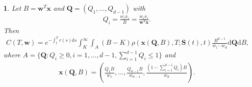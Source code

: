 \documentclass[english]{article}
\numberwithin{equation}{section}
\numberwithin{figure}{section}
\theoremstyle{bolddescit}
\theoremstyle{definition}
\theoremstyle{definition}
\theoremstyle{plain}
\newtheorem{lemma}[theorem]{\protect\lemmaname}
\theoremstyle{plain}
\theoremstyle{bolddesc}
\theoremstyle{plain}
\theoremstyle{remark}
\providecommand{\lemmaname}{Lemma}
\begin{document}
\begin{lemma}\label{lem:generalisation-var-change}
  Let $B = \mathbf{w}^T \mathbf{x}$ and $\mathbf{Q} = (Q_1,\ldots,Q_{d-1})$ with
  \begin{align}\label{eq:generalisation-var-change-Q}
    Q_i = \frac{w_i x_i}{B} = \frac{w_i x_i}{\mathbf{w}^T \mathbf{x}}.
  \end{align}
  Then
  \begin{align*}
    C(T,\mathbf{w}) = e^{-\int_t^T r(s) \mathrm{d}s} \int_K^\infty \int_A \left(B - K\right) \rho(\mathbf{x}(\mathbf{Q},B),T;\mathbf{S}(t),t) \frac{B^{d-1}}{w_1 \cdots w_d} \mathrm{d}\mathbf{Q} \mathrm{d}B,
  \end{align*}
  where $A = \{\mathbf{Q} : Q_i \ge 0, i=1,\ldots,d-1, \sum_{i=1}^{d-1} Q_i \le 1\}$ and
  \begin{align*}
    \mathbf{x}(\mathbf{Q},B) = \left(\frac{Q_1 B}{w_1},\dots, \frac{Q_{d-1} B}{w_{d-1}}, \frac{(1 - \sum_{i=1}^{d-1} Q_i) B}{w_{d}}\right).
  \end{align*}


\end{lemma}
\end{document}
